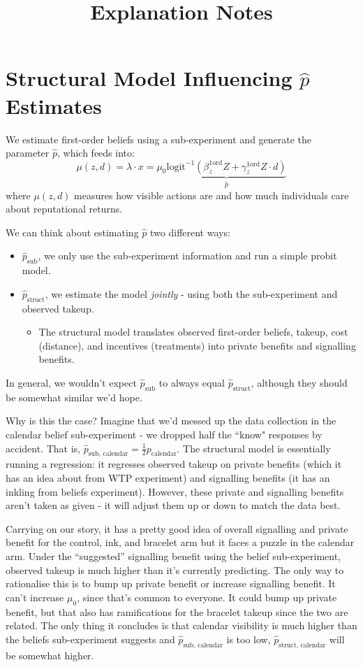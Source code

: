 \documentclass{article}
\title{Explanation Notes}
\begin{document}
\maketitle


\section*{Structural Model Influencing $\hat{p}$ Estimates}


We estimate first-order beliefs using a sub-experiment and generate the parameter 
$\hat{p}$, which feeds into:
$$
\mu(z,d) = \lambda \cdot x = \mu_0 \underbrace{
\text{logit}^{-1}(\beta^{1\text{ord}}_z Z + \gamma^{1\text{ord}}_z Z\cdot d)
    }_{
\hat{p}
    }
$$
where $\mu(z,d)$ measures how visible actions are and how much individuals care about 
reputational returns.


We can think about estimating $\hat{p}$ two different ways:
\begin{itemize}
    \item $\hat{p}_\text{sub}$, we only use the sub-experiment information and run a simple probit model.
    \item $\hat{p}_\text{struct}$, we estimate the model \emph{jointly} - using both the sub-experiment and observed takeup.
       \begin{itemize}
        \item The structural model translates observed first-order beliefs, takeup, cost (distance), and incentives (treatments) into private benefits and signalling benefits.
    \end{itemize}
\end{itemize}
In general, we wouldn't expect $\hat{p}_\text{sub}$ to always equal $\hat{p}_\text{struct}$, although they should 
be somewhat similar we'd hope. 

Why is this the case? Imagine that we'd messed up the data collection in the 
calendar belief sub-experiment - we dropped half the ``know" responses by accident. That is,
$\hat{p}_\text{sub, calendar} = \frac{1}{2}p_\text{calendar}$. The structural model is essentially running a regression: it 
regresses observed takeup on private benefits (which it has an idea about from WTP experiment) and signalling 
benefits (it has an inkling from beliefs experiment). However, these private and signalling benefits aren't taken 
as given - it will adjust them up or down to match the data best.

Carrying on our story, it has a pretty good idea of overall signalling and private benefit for the control, ink, and 
bracelet arm but it faces a puzzle in the calendar arm. Under the ``suggested'' signalling benefit 
using the belief sub-experiment, observed takeup is much higher than 
it's currently predicting. The only way to rationalise this is to bump up private benefit or increase signalling benefit. 
It can't increase $\mu_0$, since that's common to everyone. It could bump up private benefit, but that also has 
ramifications for the bracelet takeup since the two are related. The only thing it concludes is that calendar 
visibility is much higher than the beliefs sub-experiment suggests and $\hat{p}_\text{sub, calendar}$ is too low, $\hat{p}_\text{struct, calendar}$ 
will be somewhat higher.
\end{document}
